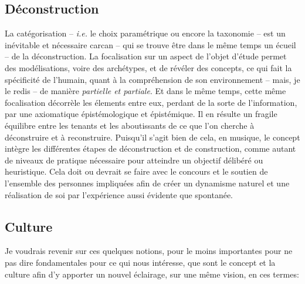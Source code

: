 \documentclass{article}
\begin{document}

\subsection{Déconstruction}

La catégorisation -- \textit{i.e.} le choix paramétrique ou encore la taxonomie -- est un inévitable et nécessaire carcan -- qui se trouve être dans le même temps un écueil -- de la déconstruction. La focalisation sur un aspect de l'objet d'étude permet des modélisations, voire des archétypes, et de révéler des concepts, ce qui fait la spécificité de l'humain, quant à la compréhension de son environnement -- mais, je le redis -- de manière \textit{partielle et partiale}. Et dans le même temps, cette même focalisation décorrèle les élements entre eux, perdant de la sorte de l'information, par  une axiomatique épistémologique et épistémique. Il en résulte un fragile équilibre entre les tenants et les aboutissants de ce que l'on cherche à déconstruire et à reconstruire. Puisqu'il s'agit bien de cela, en musique, le concept intègre les différentes étapes de déconstruction et de construction, comme autant de niveaux de pratique nécessaire pour atteindre un objectif délibéré ou heuristique. Cela doit ou devrait se faire avec le concours et le soutien de l'ensemble des personnes impliquées afin de créer un dynamisme naturel et une réalisation de soi par l'expérience aussi évidente que spontanée.


\subsection{Culture} 

Je voudrais revenir sur ces quelques notions, pour le moins importantes pour ne pas dire fondamentales pour ce qui nous intéresse, que sont le concept et la culture afin d'y apporter un nouvel éclairage, sur une même vision, en ces termes:
\end{document}
